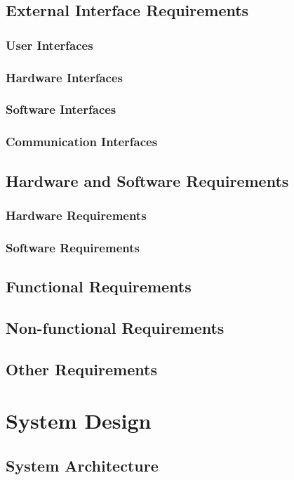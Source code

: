 \documentclass[11pt]{report}
\begin{document}
\newpage
\section{External Interface Requirements}
\subsection{User Interfaces}
\subsection{Hardware Interfaces}
\subsection{Software Interfaces}
\subsection{Communication Interfaces}

\newpage
\section{Hardware and Software Requirements}
\subsection{Hardware Requirements}
\subsection{Software Requirements}

\newpage
\section{Functional Requirements}

\newpage
\section{Non-functional Requirements}    
\section{Other Requirements} 

\chapter{System Design}
\section{System Architecture}
\end{document}

